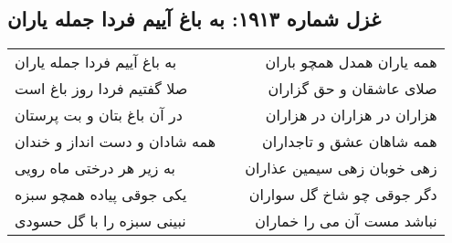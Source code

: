 \begin{center}
\section*{غزل شماره ۱۹۱۳: به باغ آییم فردا جمله یاران}
\label{sec:1913}
\begin{longtable}{l p{0.5cm} r}
به باغ آییم فردا جمله یاران
&&
همه یاران همدل همچو باران
\\
صلا گفتیم فردا روز باغ است
&&
صلای عاشقان و حق گزاران
\\
در آن باغ بتان و بت پرستان
&&
هزاران در هزاران در هزاران
\\
همه شادان و دست انداز و خندان
&&
همه شاهان عشق و تاجداران
\\
به زیر هر درختی ماه رویی
&&
زهی خوبان زهی سیمین عذاران
\\
یکی جوقی پیاده همچو سبزه
&&
دگر جوقی چو شاخ گل سواران
\\
نبینی سبزه را با گل حسودی
&&
نباشد مست آن می را خماران
\\
\end{longtable}
\end{center}
